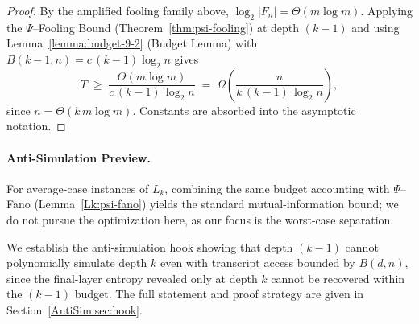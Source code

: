 \begin{proof}
By the amplified fooling family above, $\log_{2}|F_n| = \Theta(m\log m)$. Applying the $\Psi$--Fooling Bound (Theorem~\ref{thm:psi-fooling}) at depth $(k-1)$ and using Lemma~\ref{lemma:budget-9-2} (Budget Lemma) with $B(k-1,n)=c\,(k-1)\log_{2}n$ gives
\[
 T \;\ge\; \frac{\Theta(m\log m)}{c\,(k-1)\,\log_{2} n}
 \;=\; \Omega\!\left(\frac{n}{k\,(k-1)\,\log_{2} n}\right),
\]
since $n=\Theta(k\,m\log m)$. Constants are absorbed into the asymptotic notation.
\end{proof}


\paragraph{Anti-Simulation Preview.}
\begin{remark}\label{Lk:avg-fano}
For average-case instances of $L_k$, combining the same budget accounting with $\Psi$--Fano (Lemma~\ref{Lk:psi-fano}) yields the standard mutual-information bound; we do not pursue the optimization here, as our focus is the worst-case separation.
\end{remark}
We establish the anti-simulation hook showing that depth $(k{-}1)$ cannot polynomially simulate depth $k$ even with transcript access bounded by $B(d,n)$, since the final-layer entropy revealed only at depth $k$ cannot be recovered within the $(k{-}1)$ budget. The full statement and proof strategy are given in Section~\ref{AntiSim:sec:hook}.

